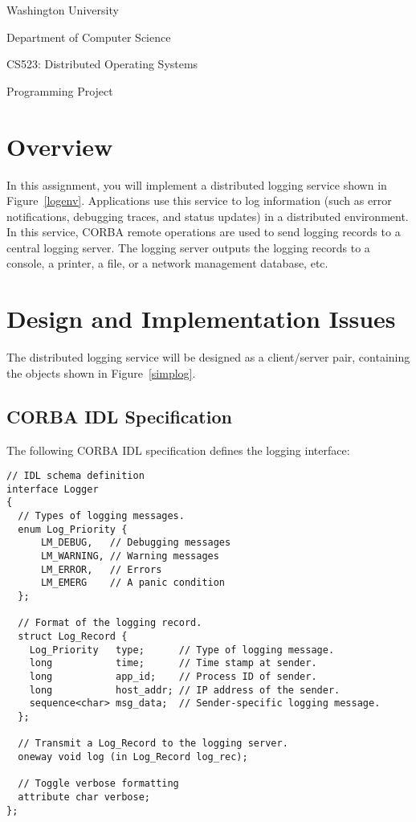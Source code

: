 




\centerline{\Large Washington University}
\centerline{\Large Department of Computer Science}
\bigskip
\centerline{\large CS523: Distributed Operating Systems}
\bigskip
\centerline{\large Programming Project}

\section{Overview}

In this assignment, you will implement a distributed logging service
shown in Figure~\ref{logenv}.  Applications use this service to log
information (such as error notifications, debugging traces, and status
updates) in a distributed environment.  In this service, CORBA remote
operations are used to send logging records to a central logging
server.  The logging server outputs the logging records to a console,
a printer, a file, or a network management database, etc.

\section{Design and Implementation Issues}

The distributed logging service will be designed as a client/server
pair, containing the objects shown in Figure~\ref{simplog}.

\subsection{CORBA IDL Specification}
The following CORBA IDL specification defines the logging interface:

{
\small
{}
\begin{verbatim}
// IDL schema definition
interface Logger
{
  // Types of logging messages.
  enum Log_Priority {
      LM_DEBUG,   // Debugging messages
      LM_WARNING, // Warning messages
      LM_ERROR,   // Errors
      LM_EMERG    // A panic condition
  };

  // Format of the logging record.
  struct Log_Record {
    Log_Priority   type;      // Type of logging message.
    long           time;      // Time stamp at sender.
    long           app_id;    // Process ID of sender.
    long           host_addr; // IP address of the sender.
    sequence<char> msg_data;  // Sender-specific logging message.
  };

  // Transmit a Log_Record to the logging server.
  oneway void log (in Log_Record log_rec);

  // Toggle verbose formatting
  attribute char verbose; 
};
\end{verbatim}}

